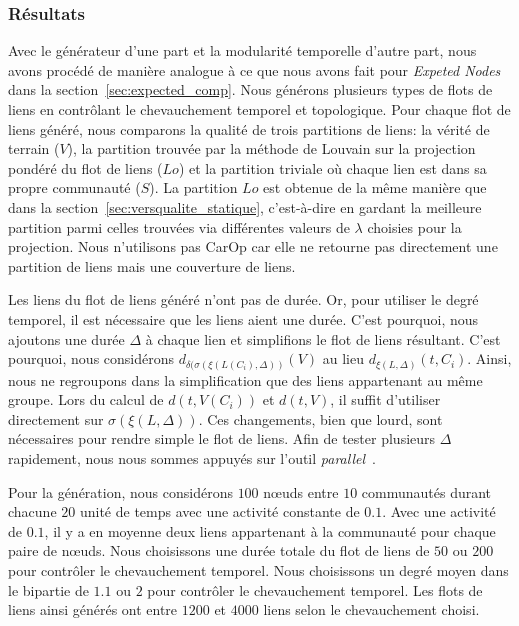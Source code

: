 \subsubsection{Résultats}

Avec le générateur d'une part et la modularité temporelle d'autre part, nous avons procédé de manière analogue à ce que nous avons fait pour \emph{Expeted Nodes} dans la section~\ref{sec:expected_comp}.
Nous générons plusieurs types de flots de liens en contrôlant le chevauchement temporel et topologique.
Pour chaque flot de liens généré, nous comparons la qualité de trois partitions de liens: la vérité de terrain ($V$), la partition trouvée par la méthode de Louvain sur la projection pondéré du flot de liens ($Lo$) et la partition triviale où chaque lien est dans sa propre communauté ($S$).
La partition $Lo$ est obtenue de la même manière que dans la section~\ref{sec:versqualite_statique}, c'est-à-dire en gardant la meilleure partition parmi celles trouvées via différentes valeurs de $\lambda$ choisies pour la projection.
Nous n'utilisons pas CarOp car elle ne retourne pas directement une partition de liens mais une couverture de liens.

Les liens du flot de liens généré n'ont pas de durée.
Or, pour utiliser le degré temporel, il est nécessaire que les liens aient une durée.
C'est pourquoi, nous ajoutons une durée $\Delta$ à chaque lien et simplifions le flot de liens résultant.
C'est pourquoi, nous considérons $d_{\delta(\sigma(\xi(L(C_i),\Delta))}(V)$ au lieu $d_{\xi(L,\Delta)}(t,C_i)$.
Ainsi, nous ne regroupons dans la simplification que des liens appartenant au même groupe.
Lors du calcul de $d(t,V(C_i))$ et $d(t,V)$, il suffit d'utiliser directement sur $\sigma(\xi(L,\Delta))$.
Ces changements, bien que lourd, sont nécessaires pour rendre simple le flot de liens.
Afin de tester plusieurs $\Delta$ rapidement, nous nous sommes appuyés sur l'outil \emph{parallel}~\cite{Tange2011a}.


\bigskip
Pour la génération, nous considérons $100$ n\oe uds entre $10$ communautés durant chacune $20$ unité de temps avec une activité constante de $0.1$.
Avec une activité de $0.1$, il y a en moyenne deux liens appartenant à la communauté pour chaque paire de n\oe uds.
Nous choisissons une durée totale du flot de liens de $50$ ou $200$ pour contrôler le chevauchement temporel.
Nous choisissons un degré moyen dans le bipartie de $1.1$ ou $2$ pour contrôler le chevauchement temporel.
Les flots de liens ainsi générés ont entre $1 200$ et $4 000$ liens selon le chevauchement choisi.

